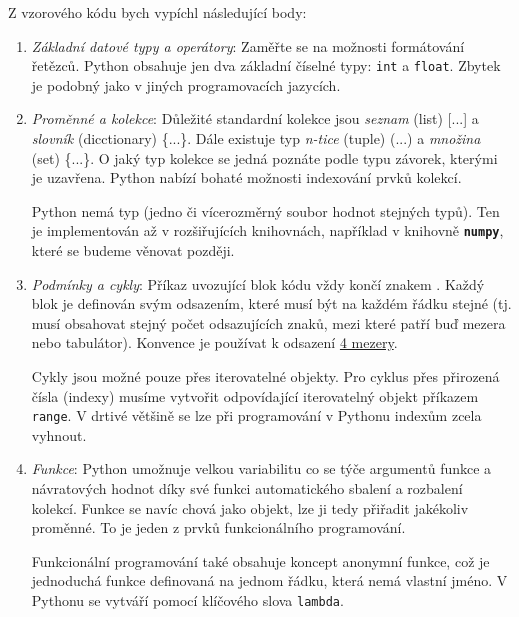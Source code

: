 \documentclass[a4paper,11pt,twoside]{article}
\def\code#1{\textnormal{\texttt{#1}}}
\def\file#1{\textnormal{\textbf{\texttt{#1}}}}
\theoremstyle{red}
\theoremstyle{green}
\begin{document}
    Z vzorového kódu bych vypíchl následující body:
    \begin{enumerate}
        \item 
            \emph{Základní datové typy a operátory}: Zaměřte se na možnosti formátování řetězců. 
            Python obsahuje jen dva základní číselné typy: \code{int} a \code{float}.
            Zbytek je podobný jako v jiných programovacích jazycích.

        \item
            \emph{Proměnné a kolekce}: 
            Důležité standardní kolekce jsou \emph{seznam} (list) [...] a \emph{slovník} (dicctionary) \{...\}.
            Dále existuje typ \emph{n-tice} (tuple) (...) a \emph{množina} (set) \{...\}.
            O jaký typ kolekce se jedná poznáte podle typu závorek, kterými je uzavřena.
            Python nabízí bohaté možnosti indexování prvků kolekcí.

            Python nemá typ  (jedno či vícerozměrný soubor hodnot stejných typů).
            Ten je implementován až v rozšiřujících knihovnách, například v knihovně \file{numpy}, které se budeme věnovat později.
            
        \item
            \emph{Podmínky a cykly}:
            Příkaz uvozující blok kódu vždy končí znakem \uv{:}.
            Každý blok je definován svým odsazením, které musí být na každém řádku stejné
            (tj. musí obsahovat stejný počet odsazujících znaků, mezi které patří buď mezera nebo tabulátor).
            Konvence je používat k odsazení \href{https://www.python.org/dev/peps/pep-0008/#indentation}{4 mezery}.

            Cykly jsou možné pouze přes iterovatelné objekty.
            Pro cyklus přes přirozená čísla (indexy) musíme vytvořit odpovídající iterovatelný objekt příkazem \code{range}.
            V drtivé většině se lze při programování v Pythonu indexům zcela vyhnout.

        \item 
            \emph{Funkce}: Python umožnuje velkou variabilitu co se týče argumentů funkce a návratových hodnot díky své funkci automatického sbalení a rozbalení kolekcí.
            Funkce se navíc chová jako objekt, lze ji tedy přiřadit jakékoliv proměnné.
            To je jeden z prvků funkcionálního programování.

            Funkcionální programování také obsahuje koncept anonymní funkce, což je jednoduchá funkce definovaná na jednom řádku, která nemá vlastní jméno.
            V Pythonu se vytváří pomocí klíčového slova \code{lambda}.


\end{enumerate}
\end{document}
